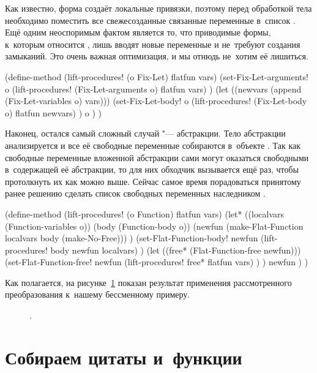 Как известно, форма  создаёт локальные привязки, поэтому перед
обработкой тела  необходимо поместить все свежесозданные связанные
переменные в~список . Ещё одним неоспоримым фактом является то, что
приводимые формы, к~которым относится , лишь вводят новые переменные и
не~требуют создания замыканий. Это очень важная оптимизация, и мы отнюдь
не~хотим её лишиться.

\begin{code:lisp}
(define-method (lift-procedures! (o Fix-Let) flatfun vars)
  (set-Fix-Let-arguments!
   o (lift-procedures! (Fix-Let-arguments o) flatfun vars) )
  (let ((newvars (append (Fix-Let-variables o) vars)))
    (set-Fix-Let-body!
     o (lift-procedures! (Fix-Let-body o) flatfun newvars) )
    o ) )
\end{code:lisp}

Наконец, остался самый сложный случай "--- абстракции. Тело абстракции
анализируется и все её свободные переменные собираются в~объекте
. Так как свободные переменные вложенной абстракции сами могут
оказаться свободными в~содержащей её абстракции, то для них обходчик вызывается
ещё раз, чтобы протолкнуть их как можно выше. Сейчас самое время порадоваться
принятому ранее решению сделать список свободных переменных наследником
.

\begin{code:lisp}
(define-method (lift-procedures! (o Function) flatfun vars)
  (let* ((localvars (Function-variables o))
         (body      (Function-body o))
         (newfun (make-Flat-Function localvars body (make-No-Free))) )
    (set-Flat-Function-body!
     newfun (lift-procedures! body newfun localvars) )
    (let ((free* (Flat-Function-free newfun)))
      (set-Flat-Function-free!
       newfun (lift-procedures! free* flatfun vars) ) )
    newfun ) )
\end{code:lisp}

Как полагается, на рисунке~\ref{cc/no-nest/pic:result} показан результат
применения рассмотренного преобразования к~нашему бессменному примеру.

\begin{figure}\centering

\caption{\protect{}.}%
\label{cc/no-nest/pic:result}
\end{figure}


\section{Собираем цитаты и~функции}\label{cc/sect:collecting}

